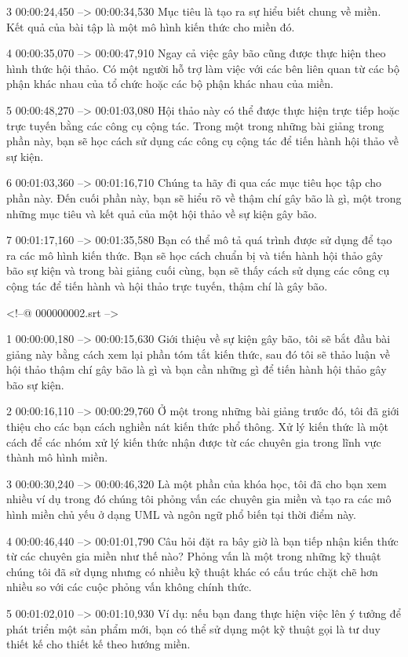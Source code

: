 3
00:00:24,450 --> 00:00:34,530
Mục tiêu là tạo ra sự hiểu biết chung về miền.  Kết quả của bài tập là một mô hình kiến ​​thức cho miền đó.

4
00:00:35,070 --> 00:00:47,910
Ngay cả việc gây bão cũng được thực hiện theo hình thức hội thảo.  Có một người hỗ trợ làm việc với các bên liên quan từ các bộ phận khác nhau của tổ chức hoặc các bộ phận khác nhau của miền.

5
00:00:48,270 --> 00:01:03,080
Hội thảo này có thể được thực hiện trực tiếp hoặc trực tuyến bằng các công cụ cộng tác.  Trong một trong những bài giảng trong phần này, bạn sẽ học cách sử dụng các công cụ cộng tác để tiến hành hội thảo về sự kiện.

6
00:01:03,360 --> 00:01:16,710
Chúng ta hãy đi qua các mục tiêu học tập cho phần này.  Đến cuối phần này, bạn sẽ hiểu rõ về thậm chí gây bão là gì, một trong những mục tiêu và kết quả của một hội thảo về sự kiện gây bão.

7
00:01:17,160 --> 00:01:35,580
Bạn có thể mô tả quá trình được sử dụng để tạo ra các mô hình kiến ​​thức.  Bạn sẽ học cách chuẩn bị và tiến hành hội thảo gây bão sự kiện và trong bài giảng cuối cùng, bạn sẽ thấy cách sử dụng các công cụ cộng tác để tiến hành và hội thảo trực tuyến, thậm chí là gây bão.

<!--@ 000000002.srt -->

1
00:00:00,180 --> 00:00:15,630
Giới thiệu về sự kiện gây bão, tôi sẽ bắt đầu bài giảng này bằng cách xem lại phần tóm tắt kiến ​​thức, sau đó tôi sẽ thảo luận về hội thảo thậm chí gây bão là gì và bạn cần những gì để tiến hành hội thảo gây bão sự kiện.

2
00:00:16,110 --> 00:00:29,760
Ở một trong những bài giảng trước đó, tôi đã giới thiệu cho các bạn cách nghiền nát kiến ​​thức phổ thông.  Xử lý kiến ​​thức là một cách để các nhóm xử lý kiến ​​thức nhận được từ các chuyên gia trong lĩnh vực thành mô hình miền.

3
00:00:30,240 --> 00:00:46,320
Là một phần của khóa học, tôi đã cho bạn xem nhiều ví dụ trong đó chúng tôi phỏng vấn các chuyên gia miền và tạo ra các mô hình miền chủ yếu ở dạng UML và ngôn ngữ phổ biến tại thời điểm này.

4
00:00:46,440 --> 00:01:01,790
Câu hỏi đặt ra bây giờ là bạn tiếp nhận kiến ​​thức từ các chuyên gia miền như thế nào?  Phỏng vấn là một trong những kỹ thuật chúng tôi đã sử dụng nhưng có nhiều kỹ thuật khác có cấu trúc chặt chẽ hơn nhiều so với các cuộc phỏng vấn không chính thức.

5
00:01:02,010 --> 00:01:10,930
Ví dụ: nếu bạn đang thực hiện việc lên ý tưởng để phát triển một sản phẩm mới, bạn có thể sử dụng một kỹ thuật gọi là tư duy thiết kế cho thiết kế theo hướng miền.


